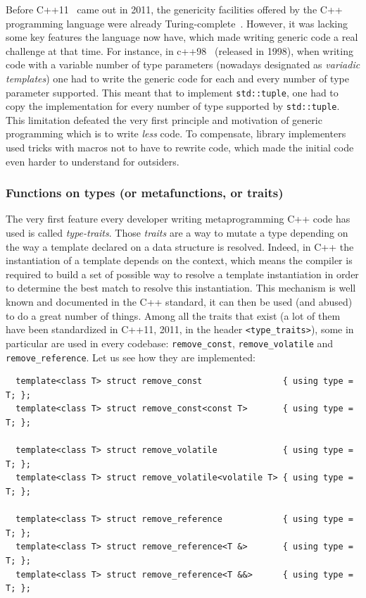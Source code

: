 Before C++11~\parencite{iso.2011.cpp} came out in 2011, the genericity facilities offered by the C++ programming
language were already Turing-complete~\parencite{veldhuizen.2003.c++templates}. However, it was lacking some key
features the language now have, which made writing generic code a real challenge at that time. For instance, in
c++98~\parencite{iso.1998.cpp} (released in 1998), when writing code with a variable number of type parameters (nowadays
designated as \emph{variadic templates}) one had to write the generic code for each and every number of type parameter
supported. This meant that to implement \texttt{std::tuple}, one had to copy the implementation for every number of type
supported by \texttt{std::tuple}. This limitation defeated the very first principle and motivation of generic
programming which is to write \emph{less} code. To compensate, library implementers used tricks with macros not to have
to rewrite code, which made the initial code even harder to understand for outsiders.


\subsubsection{Functions on types (or metafunctions, or traits)}

The very first feature every developer writing metaprogramming C++ code has used is called \emph{type-traits}. Those
\emph{traits} are a way to mutate a type depending on the way a template declared on a data structure is resolved.
Indeed, in C++ the instantiation of a template depends on the context, which means the compiler is required to build a
set of possible way to resolve a template instantiation in order to determine the best match to resolve this
instantiation. This mechanism is well known and documented in the C++ standard, it can then be used (and abused) to do a
great number of things. Among all the traits that exist (a lot of them have been standardized in C++11, 2011, in the
header \texttt{<type\_traits>}), some in particular are used in every codebase: \texttt{remove\_const},
\texttt{remove\_volatile} and \texttt{remove\_reference}. Let us see how they are implemented:

\begin{verbatim}
  template<class T> struct remove_const                { using type = T; };
  template<class T> struct remove_const<const T>       { using type = T; };

  template<class T> struct remove_volatile             { using type = T; };
  template<class T> struct remove_volatile<volatile T> { using type = T; };

  template<class T> struct remove_reference            { using type = T; };
  template<class T> struct remove_reference<T &>       { using type = T; };
  template<class T> struct remove_reference<T &&>      { using type = T; };
\end{verbatim}

